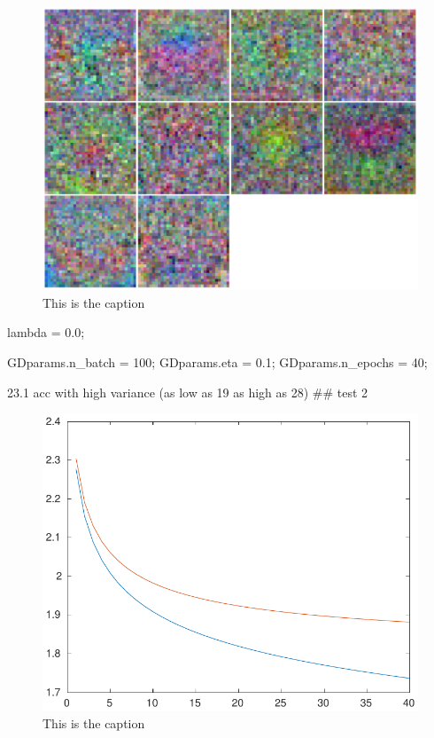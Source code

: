 \documentclass[]{article}
\begin{document}
\begin{figure}[h]
\centering
\includegraphics{../Result_Pics/b100e40eta1la0proto.pdf}
\caption{This is the caption}
\end{figure}

lambda = 0.0;

GDparams.n\_batch = 100; GDparams.eta = 0.1; GDparams.n\_epochs = 40;

23.1 acc with high variance (as low as 19 as high as 28) \#\# test 2

\begin{figure}[h]
\centering
\includegraphics{../Result_Pics/b100e40eta01la0.pdf}
\caption{This is the caption}
\end{figure}
\end{document}
